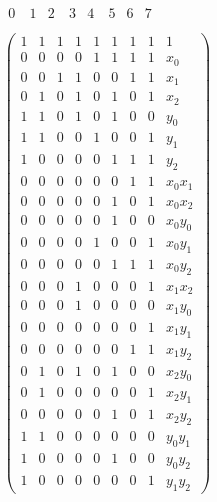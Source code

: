 \documentclass[9pt]{beamer}
\begin{document}
\begin{frame}
\begin{columns}
\begin{scriptsize}
\begin{align*}
\begin{array}{rrrrrrrrrr}
0\ & 1 & 2\  & 3 & 4\  & 5 & 6 & 7 & \ \ \ \ \ \ \ \ \ \ \\
\end{array}\\
\left(\begin{array}{rrrrrrrrr}
1 & 1 & 1 & 1 & 1 & 1 & 1 & 1 & 1 \\
0 & 0 & 0 & 0 & 1 & 1 & 1 & 1 & x_{0} \\
0 & 0 & 1 & 1 & 0 & 0 & 1 & 1 & x_{1} \\
0 & 1 & 0 & 1 & 0 & 1 & 0 & 1 & x_{2} \\
1 & 1 & 0 & 1 & 0 & 1 & 0 & 0 & y_{0} \\
1 & 1 & 0 & 0 & 1 & 0 & 0 & 1 & y_{1} \\
1 & 0 & 0 & 0 & 0 & 1 & 1 & 1 & y_{2} \\
0 & 0 & 0 & 0 & 0 & 0 & 1 & 1 & x_{0} x_{1} \\
0 & 0 & 0 & 0 & 0 & 1 & 0 & 1 & x_{0} x_{2} \\
0 & 0 & 0 & 0 & 0 & 1 & 0 & 0 & x_{0} y_{0} \\
0 & 0 & 0 & 0 & 1 & 0 & 0 & 1 & x_{0} y_{1} \\
0 & 0 & 0 & 0 & 0 & 1 & 1 & 1 & x_{0} y_{2} \\
0 & 0 & 0 & 1 & 0 & 0 & 0 & 1 & x_{1} x_{2} \\
0 & 0 & 0 & 1 & 0 & 0 & 0 & 0 & x_{1} y_{0} \\
0 & 0 & 0 & 0 & 0 & 0 & 0 & 1 & x_{1} y_{1} \\
0 & 0 & 0 & 0 & 0 & 0 & 1 & 1 & x_{1} y_{2} \\
0 & 1 & 0 & 1 & 0 & 1 & 0 & 0 & x_{2} y_{0} \\
0 & 1 & 0 & 0 & 0 & 0 & 0 & 1 & x_{2} y_{1} \\
0 & 0 & 0 & 0 & 0 & 1 & 0 & 1 & x_{2} y_{2} \\
1 & 1 & 0 & 0 & 0 & 0 & 0 & 0 & y_{0} y_{1} \\
1 & 0 & 0 & 0 & 0 & 1 & 0 & 0 & y_{0} y_{2} \\
1 & 0 & 0 & 0 & 0 & 0 & 0 & 1 & y_{1} y_{2}
\end{array}\right)
\end{align*}
\end{scriptsize}
\end{columns}
\begin{scriptsize}
\begin{align*}

\end{align*}
\end{scriptsize}
\end{frame}
\end{document}
